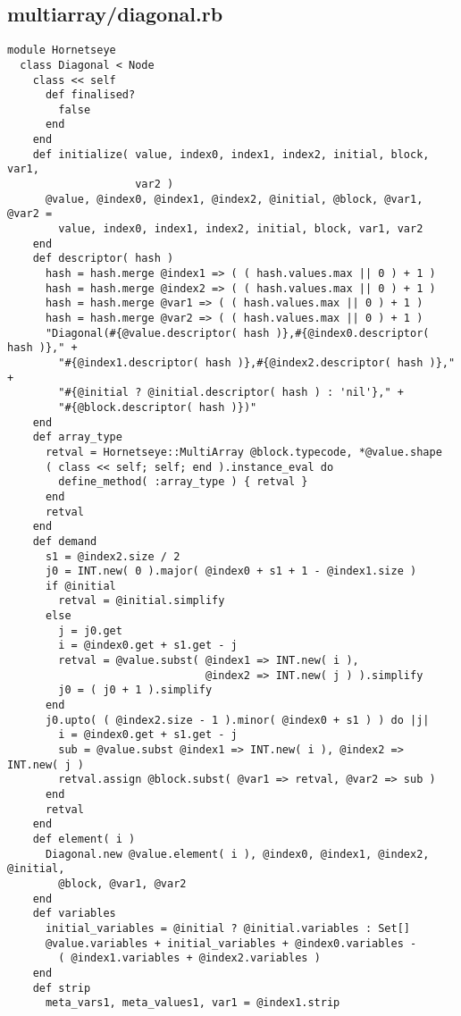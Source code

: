 \subsection{multiarray/diagonal.rb}\label{cha:multiarray-diagonal-rb}
\begin{lstlisting}
module Hornetseye
  class Diagonal < Node
    class << self
      def finalised?
        false
      end
    end
    def initialize( value, index0, index1, index2, initial, block, var1,
                    var2 )
      @value, @index0, @index1, @index2, @initial, @block, @var1, @var2 =
        value, index0, index1, index2, initial, block, var1, var2
    end
    def descriptor( hash )
      hash = hash.merge @index1 => ( ( hash.values.max || 0 ) + 1 )
      hash = hash.merge @index2 => ( ( hash.values.max || 0 ) + 1 )
      hash = hash.merge @var1 => ( ( hash.values.max || 0 ) + 1 )
      hash = hash.merge @var2 => ( ( hash.values.max || 0 ) + 1 )
      "Diagonal(#{@value.descriptor( hash )},#{@index0.descriptor( hash )}," +
        "#{@index1.descriptor( hash )},#{@index2.descriptor( hash )}," +
        "#{@initial ? @initial.descriptor( hash ) : 'nil'}," +
        "#{@block.descriptor( hash )})"
    end
    def array_type
      retval = Hornetseye::MultiArray @block.typecode, *@value.shape
      ( class << self; self; end ).instance_eval do
        define_method( :array_type ) { retval }
      end
      retval
    end
    def demand
      s1 = @index2.size / 2
      j0 = INT.new( 0 ).major( @index0 + s1 + 1 - @index1.size )
      if @initial
        retval = @initial.simplify
      else
        j = j0.get
        i = @index0.get + s1.get - j
        retval = @value.subst( @index1 => INT.new( i ),
                               @index2 => INT.new( j ) ).simplify
        j0 = ( j0 + 1 ).simplify
      end
      j0.upto( ( @index2.size - 1 ).minor( @index0 + s1 ) ) do |j|
        i = @index0.get + s1.get - j
        sub = @value.subst @index1 => INT.new( i ), @index2 => INT.new( j )
        retval.assign @block.subst( @var1 => retval, @var2 => sub )
      end
      retval
    end
    def element( i )
      Diagonal.new @value.element( i ), @index0, @index1, @index2, @initial,
        @block, @var1, @var2
    end
    def variables
      initial_variables = @initial ? @initial.variables : Set[]
      @value.variables + initial_variables + @index0.variables - 
        ( @index1.variables + @index2.variables )
    end
    def strip
      meta_vars1, meta_values1, var1 = @index1.strip

\end{lstlisting}
